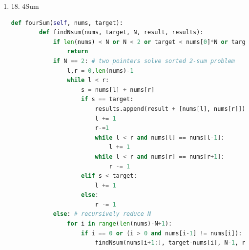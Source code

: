 \documentclass[../specific-algorithms.tex]{subfiles}
\begin{document}
\begin{enumerate}
\begin{lstlisting}[language = Python]
        for i in xrange(end_position):
            target = 0-nums[i]
            if i>0 and nums[i] == nums[i-1]: #this is to avoid repeat 
                continue
            if target<nums[i]: #if the target is smaller than this, we can not find them on the right side
                break
            for j in range(i+1,len(nums)): #this is to avoid repeat 
                if j>i+1 and nums[j]==nums[j-1]:
                    continue
                complement =target - nums[j]
                if complement<nums[j]: #if the left numbers are bigger than the complement, no need to keep searching
                    break
                if complement in dic_nums and dic_nums[complement]>j: #need to make sure the complement is bigger than nums[j]
                    res.append([nums[i],nums[j],complement])
        return res
\end{lstlisting}
The following code uses more time
\begin{lstlisting}[language = Python]
for i in xrange(len(nums)-2):
            if i > 0 and nums[i] == nums[i-1]:
                continue
            l, r = i+1, len(nums)-1
            while l < r:
                if l-1>=i+1 and nums[l] == nums[l-1]: #check the front
                    l += 1
                    continue
                if r+1<len(nums) and nums[r] == nums[r+1]:
                    r -= 1
                    continue
                s = nums[i] + nums[l] + nums[r]
                if s < 0:
                    l +=1 
                elif s > 0:
                    r -= 1
                else:
                    res.append((nums[i], nums[l], nums[r]))
                    l += 1; r -= 1
        return res
\end{lstlisting}

\item 18. 4Sum
\begin{lstlisting}[language = Python]
def fourSum(self, nums, target):
        def findNsum(nums, target, N, result, results):
            if len(nums) < N or N < 2 or target < nums[0]*N or target > nums[-1]*N:  # early termination
                return
            if N == 2: # two pointers solve sorted 2-sum problem
                l,r = 0,len(nums)-1
                while l < r:
                    s = nums[l] + nums[r]
                    if s == target:
                        results.append(result + [nums[l], nums[r]])
                        l += 1
                        r-=1
                        while l < r and nums[l] == nums[l-1]:
                            l += 1
                        while l < r and nums[r] == nums[r+1]:
                            r -= 1
                    elif s < target:
                        l += 1
                    else:
                        r -= 1
            else: # recursively reduce N
                for i in range(len(nums)-N+1):
                    if i == 0 or (i > 0 and nums[i-1] != nums[i]):
                        findNsum(nums[i+1:], target-nums[i], N-1, result+[nums[i]], results) #reduce nums size, reduce target, save result


\end{lstlisting}
\end{enumerate}
\end{document}
